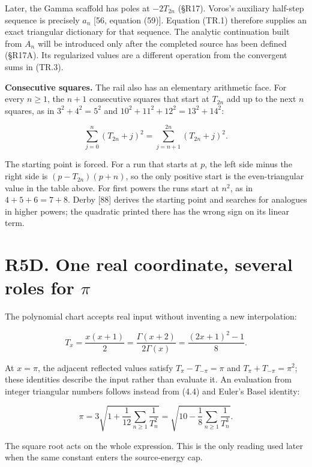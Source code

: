 \documentclass[
  11pt,
]{book}
\begin{document}
Later, the Gamma scaffold has poles at \(-2T_{2n}\) (§R17). Voros's
auxiliary half-step sequence is precisely \(a_n\) {[}56, equation
(59){]}. Equation (TR.1) therefore supplies an exact triangular
dictionary for that sequence. The analytic continuation built from
\(A_n\) will be introduced only after the completed source has been
defined (§R17A). Its regularized values are a different operation from
the convergent sums in (TR.3).

\textbf{Consecutive squares.} The rail also has an elementary arithmetic
face. For every \(n\ge1\), the \(n+1\) consecutive squares that start at
\(T_{2n}\) add up to the next \(n\) squares, as in \(3^2+4^2=5^2\) and
\(10^2+11^2+12^2=13^2+14^2\):

\[
\sum_{j=0}^{n}(T_{2n}+j)^2=\sum_{j=n+1}^{2n}(T_{2n}+j)^2.
\tag{TR.4}
\]

The starting point is forced. For a run that starts at \(p\), the left
side minus the right side is \((p-T_{2n})(p+n)\), so the only positive
start is the even-triangular value in the table above. For first powers
the runs start at \(n^2\), as in \(4+5+6=7+8\). Derby {[}88{]} derives
the starting point and searches for analogues in higher powers; the
quadratic printed there has the wrong sign on its linear term.

\section{\texorpdfstring{R5D. One real coordinate, several roles for
\(\pi\)}{R5D. One real coordinate, several roles for \textbackslash pi}}\label{r5d.-one-real-coordinate-several-roles-for-pi}

The polynomial chart accepts real input without inventing a new
interpolation:

\[
\boxed{T_x=\frac{x(x+1)}2
=\frac{\Gamma(x+2)}{2\Gamma(x)}
=\frac{(2x+1)^2-1}{8}.}
\tag{PR.1}
\]

At \(x=\pi\), the adjacent reflected values satisfy
\(T_\pi-T_{-\pi}=\pi\) and \(T_\pi+T_{-\pi}=\pi^2\); these identities
describe the input rather than evaluate it. An evaluation from integer
triangular numbers follows instead from (4.4) and Euler's Basel
identity:

\[
\boxed{\pi
=3\sqrt{1+\frac1{12}\sum_{n\ge1}\frac1{T_n^2}}
=\sqrt{10-\frac18\sum_{n\ge1}\frac1{T_n^3}}.}
\tag{PR.4a}
\]

The square root acts on the whole expression. This is the only reading
used later when the same constant enters the source-energy cap.
\end{document}
